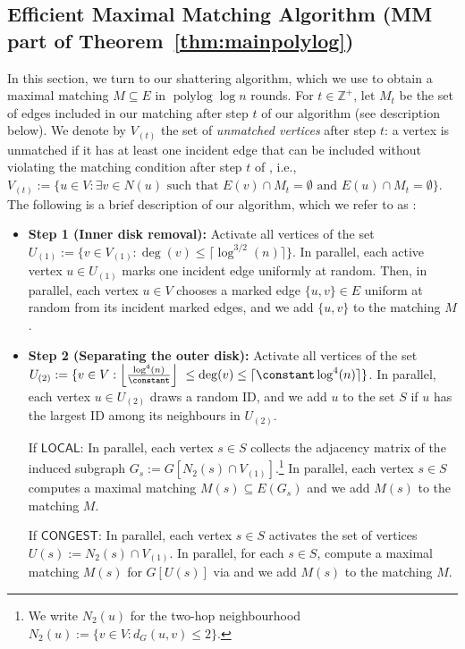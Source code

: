 \documentclass[letterpaper,11pt]{article}
\newcommand{\1}{\mathbb I}
\DeclareMathOperator{\polylog}{polylog}
\newcommand{\CONGEST}{\ensuremath{\mathsf{CONGEST}}\xspace}
\newcommand{\LOCAL}{\ensuremath{\mathsf{LOCAL}}\xspace}
\begin{document}
\subsection{Efficient Maximal Matching Algorithm (MM part of Theorem~\ref{thm:mainpolylog})}\label{sec:mm_shatter}
%
In this section, we turn to our shattering algorithm, which we use to obtain a maximal matching $M \subseteq E$ in $\polylog\log n$ rounds. {For $t \in \mathbb{Z}^+$, let $M_t$ be the set of edges included in our matching after step $t$ of our algorithm \algos (see description below). We denote by $V_{(t)}$ the set of \emph{unmatched vertices} after step $t$: a vertex is unmatched if it has at least one incident edge that can be included without violating the matching condition after step $t$ of \emph{\algos},} i.e., $V_{(t)} :=\{u \in V : \exists v \in N(u) \text{ such that } E(v) \cap M_t = \emptyset \text{ and } E(u) \cap M_t = \emptyset\}$. The following is a brief description of our algorithm, which we refer to as \algos:
%
\begin{tcolorbox}
\begin{itemize}
       \item \textbf{Step 1 (Inner disk removal):} Activate all vertices of the set \(U_{(1)} := \{v \in V_{(1)} : \deg(v) \leq \lceil \log^{3/2}(n)\rceil\}\). In parallel, each active vertex \(u \in U_{(1)}\) marks one incident edge uniformly at random. Then, in parallel, each vertex $u \in V$ chooses a marked edge $\{u,v\} \in E$ uniform at random from its incident marked edges, and we add $\{u,v\}$ to the matching $M$.
       
  \item \textbf{Step 2 (Separating the outer disk):} Activate all vertices of the set $U_{(2)} : = \{v \in V : \left\lfloor\frac{\log^{4}(n)}{\constant}\right\rfloor\ \leq \deg(v) \leq \lceil\constant \log^{4}(n) \rceil\}$. In parallel, each vertex $u \in U_{(2)}$ draws a random ID, and we add $u$ to the set $S$ if $u$ has the largest ID among its neighbours in $U_{(2)}$.
 
If \LOCAL: In parallel, each vertex $s \in S$ collects the adjacency matrix of the induced subgraph $G_s := G[N_2(s) \cap V_{(1)}]$.\footnote{We write $N_2(u)$ for the two-hop neighbourhood $N_2(u) := \{v \in V : d_G(u,v) \leq 2\}$.} In parallel, each vertex $s \in S$ computes a maximal matching $M(s) \subseteq E(G_s)$ and we add $M(s)$ to the matching $M$.
 
If \CONGEST: In parallel, each vertex $s \in S$ activates the set of vertices $U(s) := N_2(s) \cap V_{(1)}$. In parallel, for each $s \in S$, compute a maximal matching $M(s)$ for $G[U(s)]$ via \cite[Theorem 1.2]{fischer2020improved} and we add $M(s)$ to the matching $M$.
\end{itemize}
\end{tcolorbox}
\end{document}
